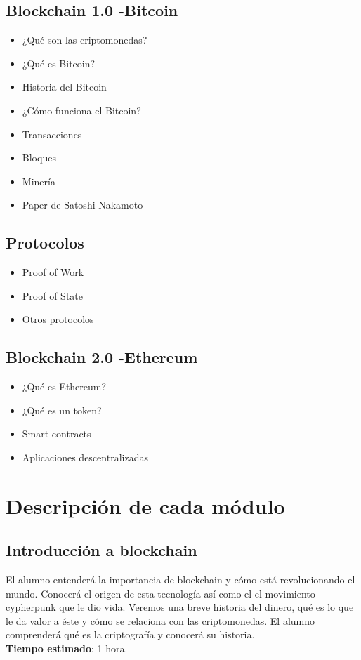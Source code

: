 \documentclass[a4paper,12pt]{/home/armando/Documentos/Cursos/LaTeX/Plantillas/lib/pub}
\begin{document}
\subsection{Blockchain 1.0 -Bitcoin}
\begin{itemize}
	\item ¿Qué son las criptomonedas?
	\item ¿Qué es Bitcoin?
	\item Historia del Bitcoin
	\item ¿Cómo funciona el Bitcoin?
	\item Transacciones
	\item Bloques
	\item Minería
	\item Paper de Satoshi Nakamoto
\end{itemize}
\subsection{Protocolos}
\begin{itemize}
	\item Proof of Work
	\item Proof of State
	\item Otros protocolos
\end{itemize}
\subsection{Blockchain 2.0 -Ethereum}
\begin{itemize}
	\item ¿Qué es Ethereum?
	\item ¿Qué es un token?
	\item Smart contracts
	\item Aplicaciones descentralizadas
\end{itemize}

\newpage
\section{Descripción de cada módulo}

\subsection{Introducción a blockchain}
El alumno entenderá la importancia de blockchain y cómo está revolucionando el mundo. Conocerá el origen de esta tecnología así como el el movimiento cypherpunk que le dio vida. Veremos una breve historia del dinero, qué es lo que le da valor a éste y cómo se relaciona con las criptomonedas. El alumno comprenderá qué es la criptografía y conocerá su historia.\\\textbf{Tiempo estimado}: 1 hora.
\end{document}
